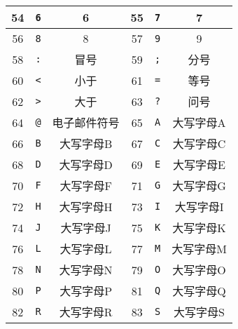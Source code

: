 \begin{longtable}{|c|c|c|c|c|c|}
        \hline \rule{0pt}{15pt}
        54   & \texttt{6}         & 6                   	& 55   & \texttt{7}         & 7                   	\\
        \hline \rule{0pt}{15pt}
        56   & \texttt{8}         & 8                   	& 57   & \texttt{9}         & 9                   	\\
        \hline \rule{0pt}{15pt}
        58   & \texttt{:}         & 冒号              	& 59   & \texttt{;}         & 分号              	\\
        \hline \rule{0pt}{15pt}
        60   & \texttt{<}         & 小于              	& 61   & \texttt{=}         & 等号              	\\
        \hline \rule{0pt}{15pt}
        62   & \texttt{>}         & 大于              	& 63   & \texttt{?}         & 问号              	\\
        \hline \rule{0pt}{15pt}
        64   & \texttt{@}         & 电子邮件符号  	& 65   & \texttt{A}         & 大写字母A       	\\
        \hline \rule{0pt}{15pt}
        66   & \texttt{B}         & 大写字母B       	& 67   & \texttt{C}         & 大写字母C       	\\
        \hline \rule{0pt}{15pt}
        68   & \texttt{D}         & 大写字母D       	& 69   & \texttt{E}         & 大写字母E       	\\
        \hline \rule{0pt}{15pt}
        70   & \texttt{F}         & 大写字母F       	& 71   & 	\texttt{G}         & 大写字母G       	\\
        \hline \rule{0pt}{15pt}
        72   & 	\texttt{H}         & 大写字母H       	& 73   & 	\texttt{I}         & 大写字母I       	\\
        \hline \rule{0pt}{15pt}
        74   & 	\texttt{J}         & 大写字母J       	& 75   & 	\texttt{K}         & 大写字母K       	\\
        \hline \rule{0pt}{15pt}
        76   &  \texttt{L}         & 大写字母L       	& 77   & 	\texttt{M}         & 大写字母M       	\\
        \hline \rule{0pt}{15pt}
        78   & 	\texttt{N}         & 大写字母N       	& 79   & 	\texttt{O}         & 大写字母O       	\\
        \hline \rule{0pt}{15pt}
        80   & 	\texttt{P}         & 大写字母P       	& 81   & 	\texttt{Q}         & 大写字母Q       	\\
        \hline \rule{0pt}{15pt}
        82   & 	\texttt{R}         & 大写字母R       	& 83   & 	\texttt{S}         & 大写字母S       	\\

\end{longtable}
